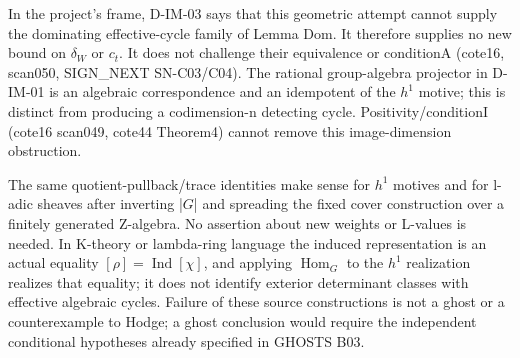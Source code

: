 In the project's frame, D-IM-03 says that this geometric attempt cannot supply the dominating effective-cycle family of Lemma Dom. It therefore supplies no new bound on \(\delta_W\) or \(c_t\). It does not challenge their equivalence or conditionA (cote16, scan050, SIGN\_NEXT SN-C03/C04). The rational group-algebra projector in D-IM-01 is an algebraic correspondence and an idempotent of the \(h^1\) motive; this is distinct from producing a codimension-n detecting cycle. Positivity/conditionI (cote16 scan049, cote44 Theorem4) cannot remove this image-dimension obstruction.

The same quotient-pullback/trace identities make sense for \(h^1\) motives and for l-adic sheaves after inverting |\(G\)| and spreading the fixed cover construction over a finitely generated Z-algebra. No assertion about new weights or L-values is needed. In K-theory or lambda-ring language the induced representation is an actual equality \([\rho]=\operatorname{Ind}[\chi]\), and applying \(\operatorname{Hom}_G\) to the \(h^1\) realization realizes that equality; it does not identify exterior determinant classes with effective algebraic cycles. Failure of these source constructions is not a ghost or a counterexample to Hodge; a ghost conclusion would require the independent conditional hypotheses already specified in GHOSTS B03.
